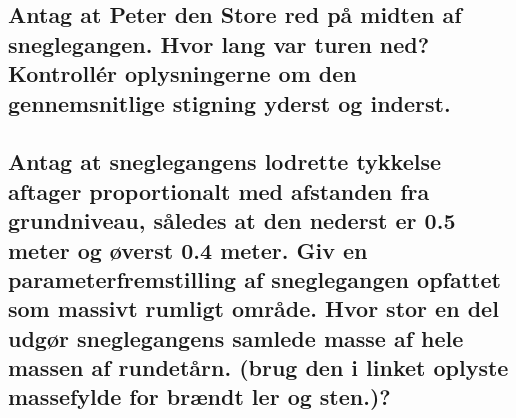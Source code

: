 \subsection{Antag at Peter den Store red på midten af sneglegangen. Hvor lang var turen ned? Kontrollér oplysningerne om den gennemsnitlige stigning yderst og inderst.}

\subsection{Antag at sneglegangens lodrette tykkelse aftager proportionalt med afstanden fra grundniveau, således at den nederst er 0.5 meter og øverst 0.4 meter. Giv en parameterfremstilling af sneglegangen opfattet som massivt rumligt område. Hvor stor en del udgør sneglegangens samlede masse af hele massen af rundetårn. (brug den i linket oplyste massefylde for brændt ler og sten.)?}